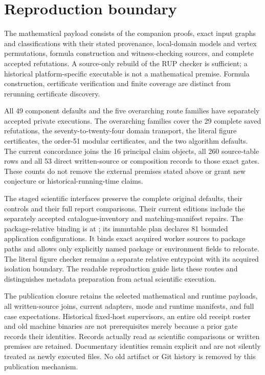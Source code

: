 \documentclass[11pt,a4paper]{article}
\begin{document}
\section{Reproduction boundary}
The mathematical payload consists of the companion proofs, exact input
graphs and classifications with their stated provenance, local-domain
models and vertex permutations, formula construction and witness-checking
sources, and complete accepted refutations. A source-only rebuild of the
RUP checker is sufficient; a historical platform-specific executable is
not a mathematical premise. Formula construction, certificate verification
and finite coverage are distinct from rerunning certificate discovery.

All 49 component defaults and the five overarching route families
have separately accepted private executions. The overarching families
cover the 29 complete saved refutations, the seventy-to-twenty-four domain
transport, the literal figure certificates, the order-51 modular
certificates, and the two algorithm defaults. The current concordance
joins the 16 principal claim objects, all 260 source-table rows and all
53 direct written-source or composition records to those exact gates.
These counts do not remove the external premises stated above or grant
new conjecture or historical-running-time claims.

The staged scientific interfaces preserve the complete original defaults,
their controls and their full report comparisons. Their current editions
include the separately accepted catalogue-inventory and matching-manifest
repairs. The package-relative binding is
at ; its
immutable plan declares 81 bounded application configurations. It binds
exact acquired worker sources to package paths and allows only explicitly
named package or environment fields to relocate. The literal figure
checker remains a separate relative entrypoint with its acquired
isolation boundary. The readable reproduction guide lists these routes
and distinguishes metadata preparation from actual scientific execution.

The publication closure retains the selected mathematical and
runtime payloads, all written-source joins, current adapters, mode and
runtime manifests, and full case expectations. Historical fixed-host
supervisors, an entire old receipt roster and old machine binaries are
not prerequisites merely because a prior gate records their identities.
Records actually read as scientific comparisons or written premises are
retained. Documentary identities remain explicit and are not silently
treated as newly executed files. No old artifact or Git history is
removed by this publication mechanism.
\end{document}
